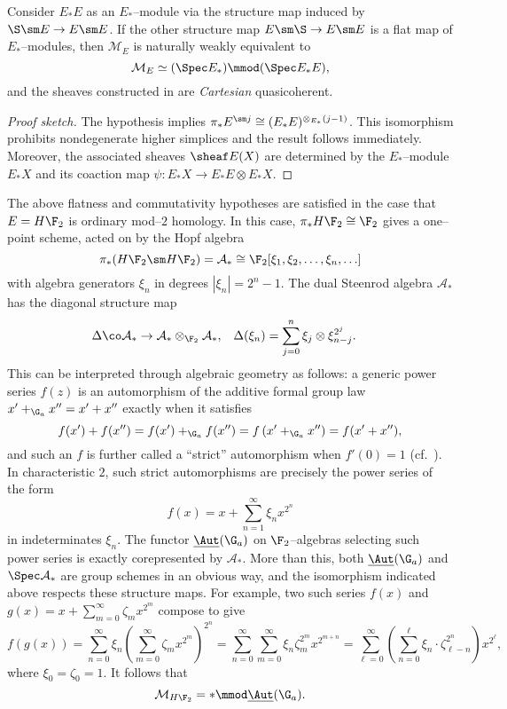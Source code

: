 \begin{lemma}\label{FlatnessLemma}
Consider $E_* E$ as an $E_*$--module via the structure map induced by $\S \sm E \to E \sm E$.  If the other structure map $E \sm \S \to E \sm E$ is a flat map of $E_*$--modules, then $\mathcal{M}_E$ is naturally weakly equivalent to \[\mathcal{M}_E \simeq (\Spec E_*) \mmod (\Spec E_* E),\] and the sheaves constructed in  are \emph{Cartesian} quasicoherent.
\end{lemma}
\begin{proof}[Proof sketch]
The hypothesis implies $\pi_* E^{\sm j} \cong (E_* E)^{\otimes_{E_*} (j-1)}$.  This isomorphism prohibits nondegenerate higher simplices and the result follows immediately.  Moreover, the associated sheaves $\sheaf E(X)$ are determined by the $E_*$--module $E_* X$ and its coaction map $\psi: E_* X \to E_* E \otimes E_* X$.
\end{proof}

\begin{example}\label{HF2StackExample}
The above flatness and commutativity hypotheses are satisfied in the case that $E = H\F_2$ is ordinary mod--$2$ homology.  In this case, $\pi_* H\F_2 \cong \F_2$ gives a one--point scheme, acted on by the Hopf algebra \[\pi_* (H\F_2 \sm H\F_2) = \mathcal{A}_* \cong \F_2[\xi_1, \xi_2, \ldots, \xi_n, \ldots]\] with algebra generators $\xi_n$ in degrees $|\xi_n| = 2^n - 1$.  The dual Steenrod algebra $\mathcal{A}_*$ has the diagonal structure map~\cite[Theorem 3]{Milnor}
\begin{align*}
\Delta \co \mathcal{A}_* \to \mathcal{A}_* \otimes_{\F_2} \mathcal{A}_*, & & \Delta(\xi_n) & = \sum_{j=0}^n \xi_j \otimes \xi_{n-j}^{2^j}.
\end{align*}
This can be interpreted through algebraic geometry as follows: a generic power series $f(z)$ is an automorphism of the additive formal group law $x' +_{\G_a} x'' = x' + x''$ exactly when it satisfies \[f(x') + f(x'') = f(x') +_{\G_a} f(x'') = f\left( x' +_{\G_a} x'' \right) = f(x' + x''),\] and such an $f$ is further called a ``strict'' automorphism when $f'(0) = 1$ (cf.\ ).  In characteristic $2$, such strict automorphisms are precisely the power series of the form \[f(x) = x + \sum_{n=1}^\infty \xi_n x^{2^n}\] in indeterminates $\xi_n$.  The functor $\underline{\Aut}(\G_a)$ on $\F_2$--algebras selecting such power series is exactly corepresented by $\mathcal{A}_*$.  More than this, both $\underline{\Aut}(\G_a)$ and $\Spec \mathcal{A}_*$ are group schemes in an obvious way, and the isomorphism indicated above respects these structure maps.  For example, two such series $f(x)$ and $g(x) = x + \sum_{m=0}^\infty \zeta_m x^{2^m}$ compose to give
\[f(g(x)) = \sum_{n=0}^\infty \xi_n \left( \sum_{m=0}^\infty \zeta_m x^{2^m} \right)^{2^n} = \sum_{n=0}^\infty \sum_{m=0}^\infty \xi_n \zeta_m^{2^m} x^{2^{m+n}} = \sum_{\ell = 0}^\infty \left( \sum_{n=0}^\ell \xi_n \cdot \zeta_{\ell - n}^{2^n} \right) x^{2^\ell},\] where $\xi_0 = \zeta_0 = 1$.  It follows that \[\mathcal{M}_{H\F_2} = * \mmod \underline{\Aut}(\G_a).\]
\end{example}

